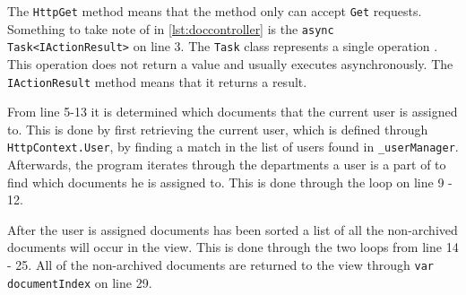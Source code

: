 The \texttt{HttpGet} method means that the method only can accept \texttt{Get} requests.
Something to take note of in \cref{lst:doccontroller} is the \texttt{async Task<IActionResult>} on line 3.
The \texttt{Task} class represents a single operation \cite{microsoft}.
This operation does not return a value and usually executes asynchronously.
The \texttt{IActionResult} method means that it returns a result.

From line 5-13 it is determined which documents that the current user is assigned to.
This is done by first retrieving the current user, which is defined through \texttt{HttpContext.User}, by finding a match in the list of users found in \texttt{_userManager}.
Afterwards, the program iterates through the departments a user is a part of to find which documents he is assigned to.
This is done through the loop on line 9 - 12.

After the user is assigned documents has been sorted a list of all the non-archived documents will occur in the view.
This is done through the two loops from line 14 - 25.
All of the non-archived documents are returned to the view through \texttt{var documentIndex} on line 29.


